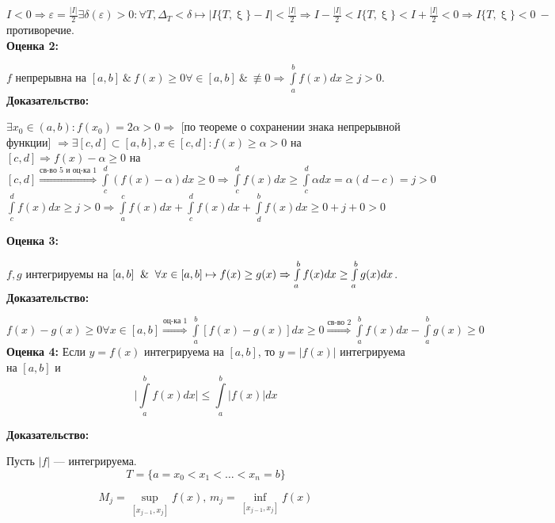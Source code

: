 \documentclass[a4paper,12pt]{article} %
\begin{document}
    $I<0 \Rightarrow \varepsilon = \frac{|I|}{2} \exists\delta(\varepsilon)>0: \forall T, \Delta_T< \delta \mapsto |I\{T,\upxi\}-I|< \frac{|I|}{2}\Rightarrow I-\frac{|I|}{2}<I\{T,\upxi\}<I+\frac{|I|}{2}<0\Rightarrow I\{T,\upxi\}<0 ~-~ $ противоречие.\\
    
\textbf{Оценка 2:}
    
    $f$ непрерывна на $[a,b] ~ \& ~ f(x) \geqslant 0 \forall \in [a,b] ~ \& ~ \not \equiv 0 \Rightarrow \int \limits_a^b f(x) dx \geqslant j>0$.\\
    
    \textbf{Доказательство:}
    
    $\exists x_0 \in (a,b): f(x_0) = 2\alpha>0 \Rightarrow$ [по теореме о сохранении знака непрерывной функции] $\Rightarrow \exists [c,d] \subset [a,b], x  \in [c,d]: f(x)\geq \alpha > 0 $ на $[c,d]\Rightarrow f(x)-\alpha \geq 0$ на $[c,d]\stackrel{\text{св-во 5 и оц-ка 1}}{\Rightarrow}\int \limits_c^d (f(x)-\alpha) dx\geq 0 \Rightarrow \int \limits_c^d f(x)dx\geq \int\limits_c^d\alpha dx = \alpha(d-c) = j > 0$\\[2mm]
    $\int \limits_c^d f(x) dx \geq j > 0 \Rightarrow \int \limits_a^c  f(x) dx  + \int \limits_c^d  f(x) dx+ \int \limits_d^b  f(x) dx \geq 0+j+0>0$
    
    \textbf{Оценка 3:}
    
    $f,g$ интегрируемы на $[a,b] \And \forall x \in [a,b]\mapsto f(x)\geq g(x) \Rightarrow\int \limits_a^b f(x) dx \geq \int \limits_a^b g(x) dx$.\\
    
    \textbf{Доказательство:}
    
    $f(x)-g(x) \geq 0 \forall x \in [a,b] \stackrel{\text{оц-ка 1}}{\Rightarrow} \int \limits_a^b [f(x)-g(x)]dx\geq 0 \stackrel{\text{св-во 2}}{\Rightarrow}\int \limits_a^b f(x)dx - \int \limits_a^b g(x) \geq 0 $\\[2mm]
    
    \textbf{Оценка 4:}
    Если $ y = f (x) $ интегрируема на $ [a,b] $, то $ y = |f(x)| $ интегрируема на $ [a, b]$ и \vspace*{1mm} \hspace*{50mm} $$\bigg|\int\limits_a^b f(x)dx\bigg| \leq \int\limits_a^b |f(x)|dx $$
    
    \textbf{Доказательство:}
    
    Пусть $ |f| $ --- интегрируема.
    $$ T = \{ a = x_0 < x_1 < \dots < x_n = b \}$$
    
    $$ M_j = \sup\limits_{[x_{j - 1}, x_j]} f(x) \text{, }m_j =  \inf\limits_{[x_{j - 1}, x_j]} f(x) $$
    
\end{document}
